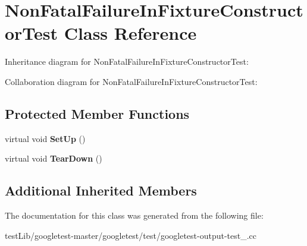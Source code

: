\hypertarget{classNonFatalFailureInFixtureConstructorTest}{}\section{Non\+Fatal\+Failure\+In\+Fixture\+Constructor\+Test Class Reference}
\label{classNonFatalFailureInFixtureConstructorTest}


Inheritance diagram for Non\+Fatal\+Failure\+In\+Fixture\+Constructor\+Test\+:


Collaboration diagram for Non\+Fatal\+Failure\+In\+Fixture\+Constructor\+Test\+:
\subsection*{Protected Member Functions}
\begin{DoxyCompactItemize}
\item 
\mbox{\label{classNonFatalFailureInFixtureConstructorTest_a7d951f8fbf7b2ac5046be8d8ee7b03d3}} 
virtual void {\bfseries Set\+Up} ()
\item 
\mbox{\label{classNonFatalFailureInFixtureConstructorTest_ab76d79c346d9a378d625fde5739e8ad6}} 
virtual void {\bfseries Tear\+Down} ()
\end{DoxyCompactItemize}
\subsection*{Additional Inherited Members}


The documentation for this class was generated from the following file\+:\begin{DoxyCompactItemize}
\item 
test\+Lib/googletest-\/master/googletest/test/googletest-\/output-\/test\+\_\+.\+cc\end{DoxyCompactItemize}
